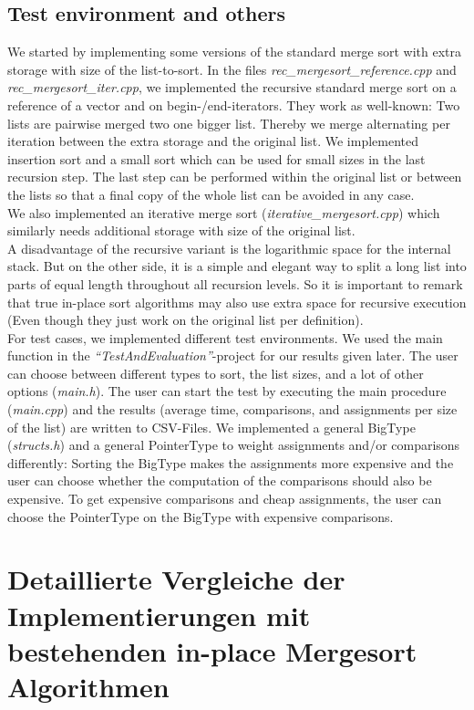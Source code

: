 \documentclass[11pt,pdftex,a4paper, twocolumn]{article}
\begin{document}
\subsection*{Test environment and others}
We started by implementing some versions of the standard merge sort with extra storage with size of the list-to-sort. In the files \textit{rec\_mergesort\_reference.cpp} and \textit{rec\_mergesort\_iter.cpp}, we implemented the recursive standard merge sort on a reference of a vector and on begin-/end-iterators. They work as well-known: Two lists are pairwise merged two one bigger list. Thereby we merge alternating per iteration between the extra storage and the original list. We implemented insertion sort and a small sort which can be used for small sizes in the last recursion step. The last step can be performed within the original list or between the lists so that a final copy of the whole list can be avoided in any case. \\
We also implemented an iterative merge sort (\textit{iterative\_mergesort.cpp}) which similarly needs additional storage with size of the original list. \\
A disadvantage of the recursive variant is the logarithmic space for the internal stack. But on the other side, it is a simple and elegant way to split a long list into parts of equal length throughout all recursion levels. So it is important to remark that true in-place sort algorithms may also use extra space for recursive execution (Even though they just work on the original list per definition). \\
For test cases, we implemented different test environments. We used the main function in the \textit{“TestAndEvaluation”}-project for our results given later. The user can choose between different types to sort, the list sizes, and a lot of other options (\textit{main.h}). The user can start the test by executing the main procedure (\textit{main.cpp}) and the results (average time, comparisons, and assignments per size of the list) are written to CSV-Files. We implemented a general BigType (\textit{structs.h}) and a general PointerType to weight assignments and/or comparisons differently: Sorting the BigType makes the assignments more expensive and the user can choose whether the computation of the comparisons should also be expensive. To get expensive comparisons and cheap assignments, the user can choose the PointerType on the BigType with expensive comparisons.

\section*{Detaillierte Vergleiche der Implementierungen mit bestehenden in-place Mergesort Algorithmen}



\end{document}
